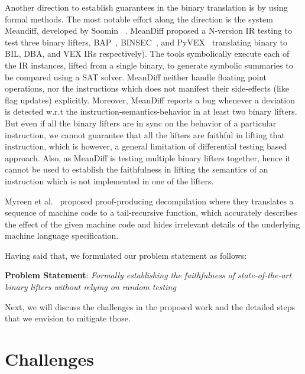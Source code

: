 Another direction to establish guarantees in the binary translation is by using formal methods. The most notable effort along the direction is the system  Meandiff, developed by Soomin \etal~\cite{ASE2017}.
%
MeanDiff proposed a N-version IR testing to test three binary lifters, BAP~\cite{BAP:CAV11}, BINSEC~\cite{BINSEC2011}, and PyVEX~\cite{PYVEX} translating binary to BIL, DBA, and VEX IRs respectively). The tools symbolically execute each of the IR instances, lifted from a single binary, to generate symbolic summaries to be compared using a SAT solver. MeanDiff neither handle floating point operations, nor the instructions which does not manifest their side-effects (like flag updates) explicitly. Moreover, MeanDiff reports a bug whenever a deviation is detected w.r.t the instruction-semantics-behavior in at least two binary lifters. But even if all the binary lifters are in sync on the behavior of a particular instruction, we cannot guarantee that all the lifters are faithful in lifting that instruction, which is however, a general limitation of differential testing based approach. Also, as MeanDiff is testing multiple binary lifters  together, hence it cannot be used to establish the faithfulness in lifting the semantics of an instruction which is not implemented in one of the lifters. 
%

Myreen et al.~\cite{Myreen:FMCAD:2008,Myreen:FMCAD:2012} proposed proof-producing decompilation where they translates a sequence of machine code to a tail-recursive function, which accurately describes the effect of the given machine code and hides irrelevant details of the underlying machine language specification.

Having said that, we formulated our problem statement as follows:

\vspace{10pt}

\noindent\textbf{Problem Statement}: \emph{Formally establishing the
  faithfulness of state-of-the-art binary lifters without relying on random
    testing}

Next, we will discuss the challenges in the proposed work and the detailed
steps that we envision to mitigate those.

\section{Challenges}\label{sec:approach}

